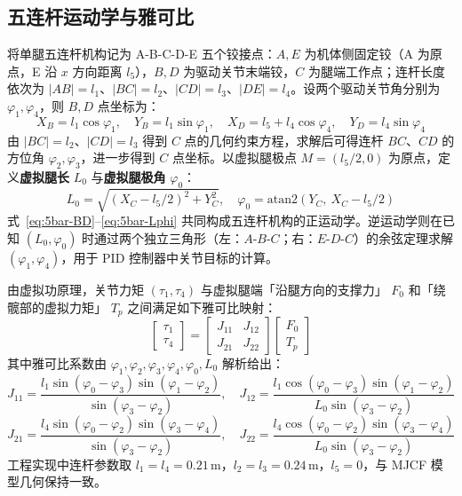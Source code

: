 \documentclass{smbuthesis}
\begin{document}
\subsection{五连杆运动学与雅可比}

将单腿五连杆机构记为 A-B-C-D-E 五个铰接点：$A, E$ 为机体侧固定铰（A 为原点，E 沿 $x$ 方向距离 $l_5$），$B, D$ 为驱动关节末端铰，$C$ 为腿端工作点；连杆长度依次为 $|AB| = l_1$、$|BC| = l_2$、$|CD| = l_3$、$|DE| = l_4$。设两个驱动关节角分别为 $\varphi_1, \varphi_4$，则 $B, D$ 点坐标为：
\begin{equation}
\label{eq:5bar-BD}
X_B = l_1 \cos\varphi_1,\quad Y_B = l_1 \sin\varphi_1,\quad X_D = l_5 + l_4 \cos\varphi_4,\quad Y_D = l_4 \sin\varphi_4
\end{equation}
由 $|BC| = l_2$、$|CD| = l_3$ 得到 $C$ 点的几何约束方程，求解后可得连杆 $BC$、$CD$ 的方位角 $\varphi_2, \varphi_3$，进一步得到 $C$ 点坐标。以虚拟腿极点 $M = (l_5/2, 0)$ 为原点，定义\textbf{虚拟腿长} $L_0$ 与\textbf{虚拟腿极角} $\varphi_0$：
\begin{equation}
\label{eq:5bar-Lphi}
L_0 = \sqrt{(X_C - l_5/2)^2 + Y_C^2},\quad \varphi_0 = \mathrm{atan2}(Y_C,\ X_C - l_5/2)
\end{equation}
式~\eqref{eq:5bar-BD}--\eqref{eq:5bar-Lphi} 共同构成五连杆机构的正运动学。逆运动学则在已知 $(L_0, \varphi_0)$ 时通过两个独立三角形（左：$A$-$B$-$C$；右：$E$-$D$-$C$）的余弦定理求解 $(\varphi_1, \varphi_4)$，用于 PID 控制器中关节目标的计算。

由虚拟功原理，关节力矩 $(\tau_1, \tau_4)$ 与虚拟腿端「沿腿方向的支撑力」 $F_0$ 和「绕髋部的虚拟力矩」 $T_p$ 之间满足如下雅可比映射：
\begin{equation}
\label{eq:jacobian-map}
\begin{bmatrix} \tau_1 \\ \tau_4 \end{bmatrix}
= \begin{bmatrix} J_{11} & J_{12} \\ J_{21} & J_{22} \end{bmatrix}
\begin{bmatrix} F_0 \\ T_p \end{bmatrix}
\end{equation}
其中雅可比系数由 $\varphi_1, \varphi_2, \varphi_3, \varphi_4, \varphi_0, L_0$ 解析给出：
\begin{equation}
\label{eq:jacobian-row1}
J_{11} = \frac{l_1 \sin(\varphi_0 - \varphi_3)\sin(\varphi_1 - \varphi_2)}{\sin(\varphi_3 - \varphi_2)},\quad
J_{12} = \frac{l_1 \cos(\varphi_0 - \varphi_3)\sin(\varphi_1 - \varphi_2)}{L_0 \sin(\varphi_3 - \varphi_2)}
\end{equation}
\begin{equation}
\label{eq:jacobian-row2}
J_{21} = \frac{l_4 \sin(\varphi_0 - \varphi_2)\sin(\varphi_3 - \varphi_4)}{\sin(\varphi_3 - \varphi_2)},\quad
J_{22} = \frac{l_4 \cos(\varphi_0 - \varphi_2)\sin(\varphi_3 - \varphi_4)}{L_0 \sin(\varphi_3 - \varphi_2)}
\end{equation}
工程实现中连杆参数取 $l_1 = l_4 = 0.21\,\mathrm{m}$，$l_2 = l_3 = 0.24\,\mathrm{m}$，$l_5 = 0$，与 MJCF 模型几何保持一致。
\end{document}
